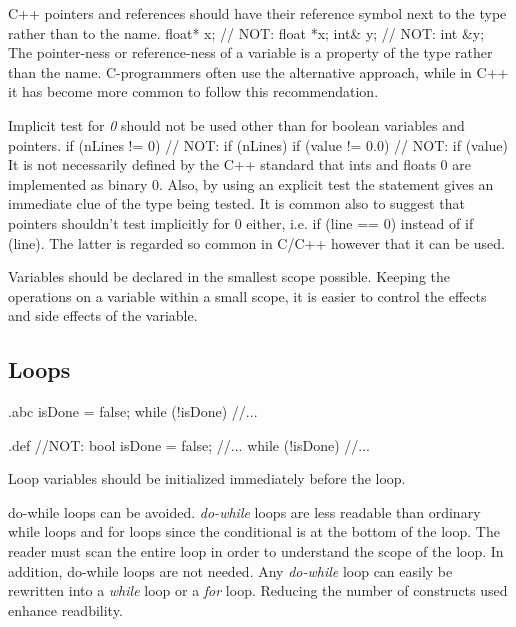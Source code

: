 \recommendation
{C++ pointers and references should have their reference symbol next to the type rather than to the name.}
{
	float* x; // NOT: float *x;\newline
	int\& y;  // NOT: int \&y;
}
{The pointer-ness or reference-ness of a variable is a property of the type rather than the name. C-programmers often use the alternative approach, while in C++ it has become more common to follow this recommendation.}

\recommendation
{Implicit test for \textit{0} should not be used other than for boolean variables and pointers.}
{
	if (nLines != 0)  // NOT: if (nLines)\newline
	if (value != 0.0) // NOT: if (value)
}
{
	It is not necessarily defined by the C++ standard that ints and floats 0 are implemented as binary 0. Also, by using an explicit test the statement gives an immediate clue of the type being tested.\newline
	It is common also to suggest that pointers shouldn't test implicitly for 0 either, i.e. if (line == 0) instead of if (line). The latter is regarded so common in C/C++ however that it can be used.
}

\recommendation
{Variables should be declared in the smallest scope possible.}
{}
{Keeping the operations on a variable within a small scope, it is easier to control the effects and side effects of the variable.}

\subsection{Loops}


\begin{filecontents*}{\jobname.abc}
	isDone = false;
	while (!isDone) {
		//...
	}
\end{filecontents*}

\begin{filecontents*}{\jobname.def}
	//NOT:
	bool isDone = false;
	//...
	while (!isDone) {
		//...
	}
\end{filecontents*}

\recommendation
{Loop variables should be initialized immediately before the loop.}
{
}
{}

\recommendation
{do-while loops can be avoided.}
{}
{
	\textit{do-while} loops are less readable than ordinary while loops and for loops since the conditional is at the bottom of the loop. The reader must scan the entire loop in order to understand the scope of the loop.\newline
	In addition, do-while loops are not needed. Any \textit{do-while} loop can easily be rewritten into a \textit{while} loop or a \textit{for} loop. Reducing the number of constructs used enhance readbility.
}


